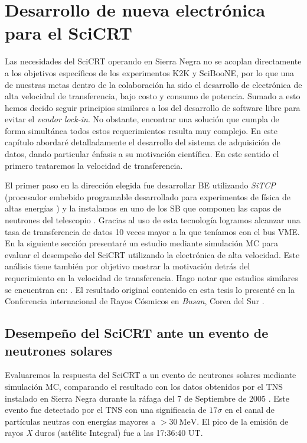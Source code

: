 
\chapter{Desarrollo de nueva electrónica para el SciCRT}
\label{chap:tres}

Las necesidades del SciCRT operando en Sierra Negra no se acoplan directamente a los objetivos específicos de los experimentos K2K y SciBooNE, por lo que una de nuestras metas dentro de la colaboración ha sido el desarrollo de electrónica de alta velocidad de transferencia, bajo costo y consumo de potencia. Sumado a esto hemos decido seguir principios similares a los del desarrollo de software libre para evitar el \emph{vendor lock-in}. No obstante, encontrar una solución que cumpla de forma simultánea todos estos requerimientos resulta muy complejo. En este capítulo abordaré detalladamente el desarrollo del sistema de adquisición de datos, dando particular énfasis a su motivación científica. En este sentido el primero trataremos la velocidad de transferencia.

El primer paso en la dirección elegida fue desarrollar BE utilizando \emph{SiTCP} (procesador embebido programable desarrollado para experimentos de física de altas energías \cite{uchida08}) y la instalamos en uno de los SB que componen las capas de neutrones del telescopio \cite{ysasai17}. Gracias al uso de esta tecnología logramos alcanzar una tasa de transferencia de datos \num{10} veces mayor a la que teníamos con el bus VME. En la siguiente sección presentaré un estudio mediante simulación MC para evaluar el desempeño del SciCRT utilizando la electrónica de alta velocidad. Este análisis tiene también por objetivo mostrar la motivación detrás del requerimiento en la velocidad de transferencia. Hago notar que estudios similares se encuentran en: \cite{ynagai14,ysasai17}. El resultado original contenido en esta tesis lo presenté en la Conferencia internacional de Rayos Cósmicos en \emph{Busan}, Corea del Sur \cite{manzorena171}.

\section{Desempeño del SciCRT ante un evento de neutrones solares}

Evaluaremos la respuesta del SciCRT a un evento de neutrones solares mediante simulación MC, comparando el resultado con los datos obtenidos por el TNS instalado en Sierra Negra durante la ráfaga del \num{7} de Septiembre de \num{2005} \cite{sako06}. Este evento fue detectado por el TNS con una significacia de $17\sigma$ en el canal de partículas neutras con energías mayores a $>\SI{30}{\mega\electronvolt}$. El pico de la emisión de rayos \emph{X} duros (satélite Integral) fue a las 17:36:40 UT.

